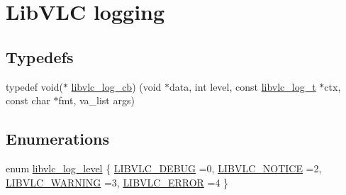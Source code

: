 \hypertarget{group__libvlc__log}{}\section{Lib\+V\+LC logging}
\label{group__libvlc__log}
\subsection*{Typedefs}
\begin{DoxyCompactItemize}
\item 
typedef void($\ast$ \hyperlink{group__libvlc__log_ga2bc7c11ca559e643b90fc4d55f0c131c}{libvlc\+\_\+log\+\_\+cb}) (void $\ast$data, int level, const \hyperlink{structvlc__log__t}{libvlc\+\_\+log\+\_\+t} $\ast$ctx, const char $\ast$fmt, va\+\_\+list args)
\end{DoxyCompactItemize}
\subsection*{Enumerations}
\begin{DoxyCompactItemize}
\item 
enum \hyperlink{group__libvlc__log_gafbd0cda573ef789842e1cd36a27a61bd}{libvlc\+\_\+log\+\_\+level} \{ \hyperlink{group__libvlc__log_ggafbd0cda573ef789842e1cd36a27a61bdaf9c82a86ac07470ff2bce574a37c7fd8}{L\+I\+B\+V\+L\+C\+\_\+\+D\+E\+B\+UG} =0, 
\hyperlink{group__libvlc__log_ggafbd0cda573ef789842e1cd36a27a61bdaadba41359b9572613c9aad1f8d7dcadf}{L\+I\+B\+V\+L\+C\+\_\+\+N\+O\+T\+I\+CE} =2, 
\hyperlink{group__libvlc__log_ggafbd0cda573ef789842e1cd36a27a61bda808a15b1ed05efe7fe021c84f4d01d08}{L\+I\+B\+V\+L\+C\+\_\+\+W\+A\+R\+N\+I\+NG} =3, 
\hyperlink{group__libvlc__log_ggafbd0cda573ef789842e1cd36a27a61bda53be6dc6f7aa8d745361db18f1075d6f}{L\+I\+B\+V\+L\+C\+\_\+\+E\+R\+R\+OR} =4
 \}
\end{DoxyCompactItemize}
